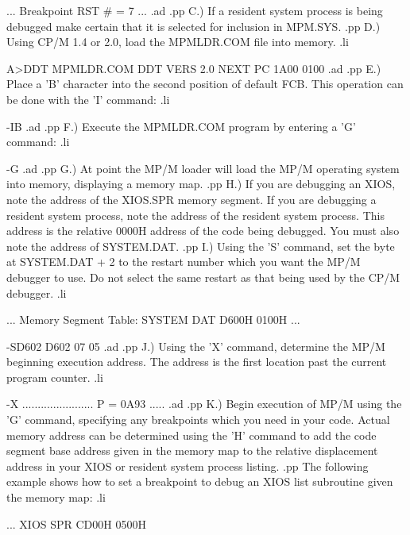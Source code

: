                ...
               Breakpoint RST #  = 7
               ...
.ad
.pp
C.)  If a resident system process is being debugged make
certain that it is selected for inclusion in MPM.SYS.
.pp
D.)  Using CP/M 1.4 or 2.0, load the MPMLDR.COM file into
memory.
.li

               A>DDT MPMLDR.COM
               DDT VERS 2.0
               NEXT  PC
               1A00 0100
.ad
.pp
E.)  Place a 'B' character into the second position of
default FCB.  This operation can be done with the 'I' command:
.li

               -IB
.ad
.pp
F.)  Execute the MPMLDR.COM program by entering a 'G'
command:
.li

               -G
.ad
.pp
G.)  At point the MP/M loader will load the MP/M operating
system into memory, displaying a memory map.
.pp
H.)  If you are debugging an XIOS, note the address of the
XIOS.SPR memory segment.  If you are debugging a resident system
process, note the address of the resident system process.  This
address is the relative 0000H address of the code being debugged.
You must also note the address of SYSTEM.DAT.
.pp
I.)  Using the 'S' command, set the byte at SYSTEM.DAT + 2
to the restart number which you want the MP/M debugger to use.
Do not select the same restart as that being used by the CP/M
debugger.
.li

               ...
               Memory Segment Table:
               SYSTEM  DAT  D600H  0100H
               ...

               -SD602
               D602 07 05
.ad
.pp
J.)  Using the 'X' command, determine the MP/M beginning
execution address.  The address is the first location past
the current program counter.
.li

               -X
               ....................... P = 0A93 .....
.ad
.pp
K.)  Begin execution of MP/M using the 'G' command, specifying
any breakpoints which you need in your code.  Actual memory address
can be determined using the 'H' command to add the code segment
base address given in the memory map to the relative displacement
address in your XIOS or resident system process listing.
.pp
The following example shows how to set a breakpoint to
debug an XIOS list subroutine given the memory map:
.li

               ...
               XIOS    SPR  CD00H  0500H


